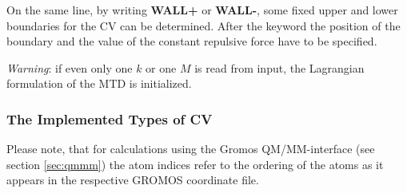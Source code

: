 \documentclass[twoside,10pt,titlepage,a4paper]{article}
\begin{document}
On the same line, by writing {\bf WALL+ } or {\bf WALL-}, some fixed upper
and lower boundaries
for the CV can be determined. After the keyword the position of the boundary
and the value of the constant repulsive force have to be specified.

{\it Warning}: if even only one $k$ or one $M$ is read from input,
the Lagrangian formulation of the MTD is initialized.

\subsubsection{The Implemented Types of CV}
Please note, that for calculations using the Gromos
QM/MM-interface (see section \ref{sec:qmmm}) the atom indices refer
to the ordering of the atoms as it appears in the respective GROMOS
coordinate file.
\end{document}
